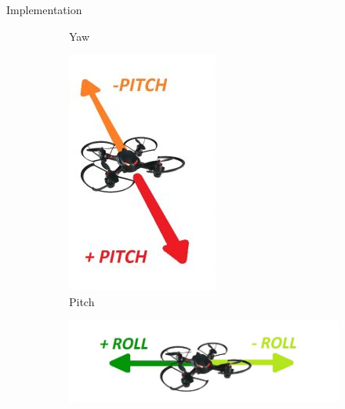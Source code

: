 \documentclass[12pt, oneside]{report}
\numberwithin{equation}{section}
\begin{document}
\begin{chapter}{Implementation}
\begin{figure}[h]
\begin{subfigure}[hb]{0.2\textwidth}
\caption{Yaw}
\end{subfigure}
\begin{subfigure}[hb]{0.2\textwidth}
\includegraphics[width=\textwidth]{Pitch}
\caption{Pitch}
\end{subfigure}
\begin{subfigure}[hb]{0.2\textwidth}
\includegraphics[width=\textwidth]{Roll}

\end{subfigure}
\end{figure}
\end{chapter}
\end{document}
